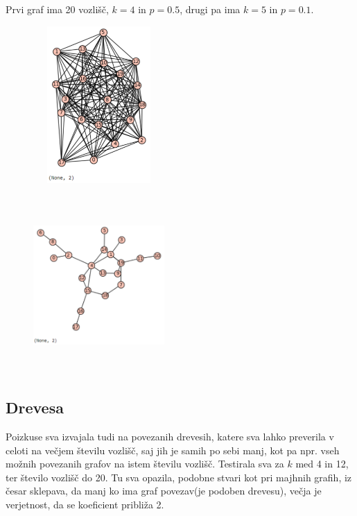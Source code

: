 \documentclass[a4paper]{article}
\begin{document}
Prvi graf ima 20 vozlišč, $k=4$ in $p=0.5$, drugi pa ima $k=5$ in $p=0.1$.
\begin{figure}[h!]
    \centering
    \includegraphics[width=5cm, height=6cm]{Slika5}
    \label{fig:mesh1}
\end{figure}\\
\begin{figure}[h!]
    \centering
    \includegraphics[width=5cm, height=5cm]{Slika6}
    \label{fig:mesh1}
\end{figure}\\

\subsection{Drevesa}

Poizkuse sva izvajala tudi na povezanih drevesih, katere sva lahko preverila v celoti na večjem številu vozlišč, saj jih je samih po sebi manj, kot pa npr. vseh možnih povezanih grafov na istem številu vozlišč. Testirala sva za $k$ med 4 in 12, ter število vozlišč do 20. Tu sva opazila, podobne stvari kot pri majhnih grafih, iz česar sklepava, da manj ko ima graf povezav(je podoben drevesu), večja je verjetnost, da se koeficient približa 2.\\

\pagebreak
\end{document}
